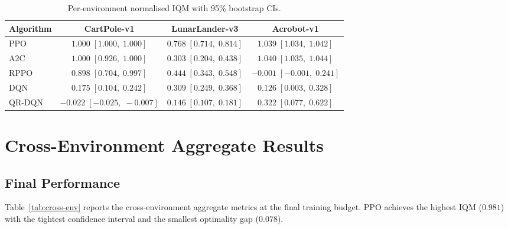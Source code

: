 \begin{table}[htbp!]
\centering
\caption[EXP1: Per-environment IQM]{Per-environment normalised IQM with 95\% bootstrap CIs.}
\label{tab:per-env-iqm}
\begin{tabular}{lccc}
\toprule
\textbf{Algorithm} & \textbf{CartPole-v1} & \textbf{LunarLander-v3}
                   & \textbf{Acrobot-v1} \\
\midrule
PPO    & $1.000\;[1.000,\;1.000]$ & $0.768\;[0.714,\;0.814]$
       & $1.039\;[1.034,\;1.042]$ \\
A2C    & $1.000\;[0.926,\;1.000]$ & $0.303\;[0.204,\;0.438]$
       & $1.040\;[1.035,\;1.044]$ \\
RPPO   & $0.898\;[0.704,\;0.997]$ & $0.444\;[0.343,\;0.548]$
       & $-0.001\;[-0.001,\;0.241]$ \\
DQN    & $0.175\;[0.104,\;0.242]$ & $0.309\;[0.249,\;0.368]$
       & $0.126\;[0.003,\;0.328]$ \\
QR-DQN & $-0.022\;[-0.025,\;-0.007]$ & $0.146\;[0.107,\;0.181]$
       & $0.322\;[0.077,\;0.622]$ \\
\bottomrule
\end{tabular}
\end{table}

\section{Cross-Environment Aggregate Results}
\label{sec:cross-env-results}

\subsection{Final Performance}
\label{sec:final-perf}

Table~\ref{tab:cross-env} reports the cross-environment aggregate metrics
at the final training budget. PPO achieves the highest IQM ($0.981$) with
the tightest confidence interval and the smallest optimality gap ($0.078$).

